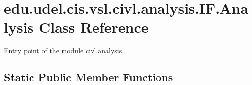 \hypertarget{classedu_1_1udel_1_1cis_1_1vsl_1_1civl_1_1analysis_1_1IF_1_1Analysis}{}\section{edu.\+udel.\+cis.\+vsl.\+civl.\+analysis.\+I\+F.\+Analysis Class Reference}
\label{classedu_1_1udel_1_1cis_1_1vsl_1_1civl_1_1analysis_1_1IF_1_1Analysis}


Entry point of the module civl.\+analysis.  


\subsection*{Static Public Member Functions}
